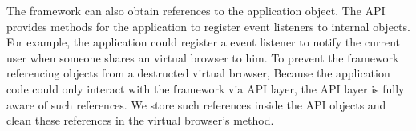 \apireferencefig{}


The framework can also obtain references to the application object.  The API
provides methods for the application to register event listeners to internal
objects. For example, the application could register a event listener to
notify the current user when someone shares an virtual browser to him. To
prevent the framework referencing objects from a destructed virtual browser,
Because the application code could only interact with the framework via API
layer, the API layer is fully aware of such references. We store such
references inside the API objects and clean these references in the virtual
browser's  method.


